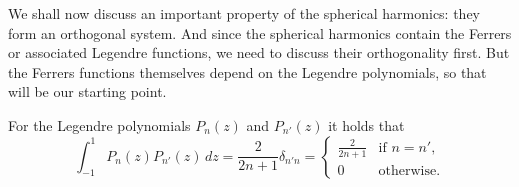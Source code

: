 We shall now discuss an important property of the spherical harmonics: they form
an orthogonal system. And since the spherical harmonics contain the Ferrers or
associated Legendre functions, we need to discuss their orthogonality first.
But the Ferrers functions themselves depend on the Legendre polynomials, so that
will be our starting point.

\begin{lemma} For the Legendre polynomials $P_n(z)$ and $P_{n'}(z)$ it holds that
  \label{kugel:thm:legendre-poly-ortho}
  \begin{equation*}
    \int_{-1}^1 P_n(z) P_{n'}(z) \, dz
    = \frac{2}{2n + 1} \delta_{n'n}
    = \begin{cases}
      \frac{2}{2n + 1} & \text{if } n = {n'}, \\
      0 & \text{otherwise}.
    \end{cases}
  \end{equation*}
\end{lemma}

